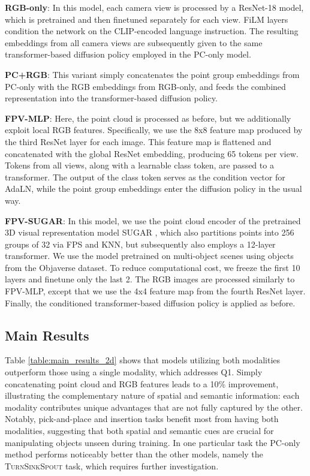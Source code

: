 \textbf{RGB-only}:
In this model, each camera view is processed by a ResNet-18 model, which is pretrained and then finetuned separately for each view. FiLM layers condition the network on the CLIP-encoded language instruction. The resulting embeddings from all camera views are subsequently given to the same transformer-based diffusion policy employed in the PC-only model.


\textbf{PC+RGB}:
This variant simply concatenates the point group embeddings from PC-only with the RGB embeddings from RGB-only, and feeds the combined representation into the transformer-based diffusion policy.

\textbf{FPV-MLP}:
Here, the point cloud is processed as before, but we additionally exploit local RGB features. Specifically, we use the 8x8 feature map produced by the third ResNet layer for each image. This feature map is flattened and concatenated with the global ResNet embedding, producing 65 tokens per view. Tokens from all views, along with a learnable class token, are passed to a transformer. The output of the class token serves as the condition vector for AdaLN, while the point group embeddings enter the diffusion policy in the usual way. 

\textbf{FPV-SUGAR}:
In this model, we use the point cloud encoder of the pretrained 3D visual representation model SUGAR \cite{Chen_2024_SUGAR}, which also partitions points into 256 groups of 32 via FPS and KNN, but subsequently also employs a 12-layer transformer. We use the model pretrained on multi-object scenes using objects from the Objaverse \cite{objaverse} dataset. To reduce computational cost, we freeze the first 10 layers and finetune only the last 2. The RGB images are processed similarly to FPV-MLP, except that we use the 4x4 feature map from the fourth ResNet layer. Finally, the conditioned transformer-based diffusion policy is applied as before.

\subsection{Main Results}


Table \ref{table:main_results_2d} shows that models utilizing both modalities outperform those using a single modality, which addresses Q1. Simply concatenating point cloud and RGB features leads to a 10\% improvement, illustrating the complementary nature of spatial and semantic information: each modality contributes unique advantages that are not fully captured by the other. Notably, pick-and-place and insertion tasks benefit most from having both modalities, suggesting that both spatial and semantic cues are crucial for manipulating objects unseen during training.
In one particular task the PC-only method performs noticeably better than the other models, namely the \textsc{TurnSinkSpout} task, which requires further investigation.



